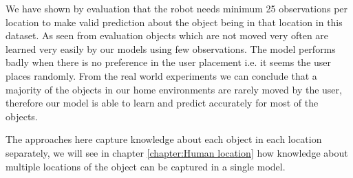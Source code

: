We have shown by evaluation that the robot needs minimum 25 observations per location to make valid prediction about the object being in that location in this dataset. As seen from evaluation objects which are not moved very often are learned very easily by our models using few observations. The model performs badly when there is no preference in the user placement i.e. it seems the user places randomly. 
From the real world experiments we can conclude that a majority of the objects in our home environments are rarely moved by the user, therefore our model is able to learn and predict accurately for most of the objects. 

The approaches here capture knowledge about each object in each location separately, we will see in chapter \ref{chapter:Human location} how knowledge about multiple locations of the object can be captured in a single model.